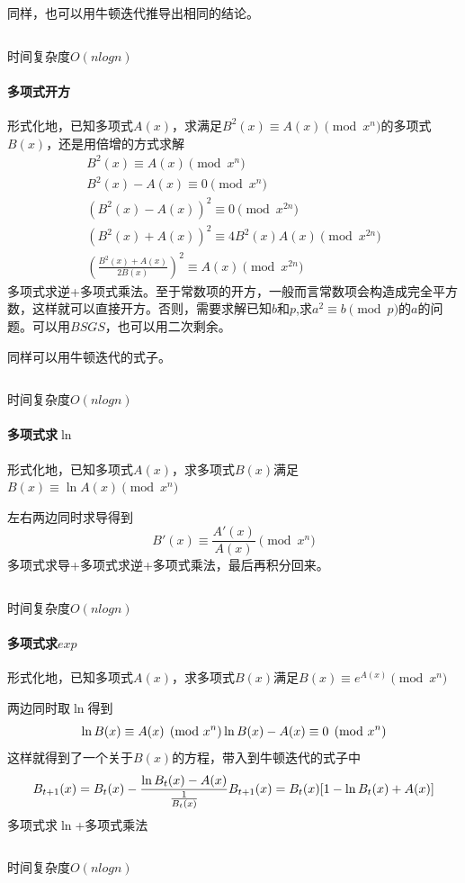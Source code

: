 \documentclass[UTF-8]{ctexart}
\newcommand{\cpp}[1]{\inputminted[bgcolor=bg,breaklines,breakanywhere=true]{c++}{#1}}
\begin{document}
			同样，也可以用牛顿迭代推导出相同的结论。
			\cpp{code//Math//polyinv.cpp}
			时间复杂度$O(nlogn)$
			\paragraph{多项式开方} 形式化地，已知多项式$A(x)$，求满足$B^2(x) \equiv A(x) \pmod{x^n}$的多项式$B(x)$，还是用倍增的方式求解
			\begin{align}
			B^2(x) \equiv A(x) \pmod{x^n} \nonumber\\ B^2(x)-A(x) \equiv 0 \pmod {x^n} \nonumber\\ (B^2(x)-A(x))^2 \equiv 0 \pmod{x^{2n}} \nonumber\\ (B^2(x)+A(x))^2 \equiv 4B^2(x)A(x) \pmod{x^{2n}} \nonumber\\ ( \frac{B^2(x)+A(x)}{2B(x)} ) ^2 \equiv A(x) \pmod{x^{2n}}\nonumber
			\end{align}
			多项式求逆+多项式乘法。至于常数项的开方，一般而言常数项会构造成完全平方数，这样就可以直接开方。否则，需要求解已知$b$和$p$,求$a^2 \equiv b \pmod{p}$的$a$的问题。可以用$BSGS$，也可以用二次剩余。
			
			同样可以用牛顿迭代的式子。
			\cpp{code//Math//polysqrt.cpp}
			时间复杂度$O(nlogn)$
			\paragraph{多项式求$\ln$} 形式化地，已知多项式$A(x)$，求多项式$B(x)$满足$B(x) \equiv \ln{A(x)} \pmod{x^n}$  
			
			左右两边同时求导得到
			$$B'(x) \equiv \frac{A'(x)}{A(x)} \pmod{x^n}$$
			多项式求导+多项式求逆+多项式乘法，最后再积分回来。
			\cpp{code//Math//polyln.cpp}
			时间复杂度$O(nlogn)$
			\paragraph{多项式求$exp$}形式化地，已知多项式$A(x)$，求多项式$B(x)$满足$B(x) \equiv e^{A(x)} \pmod{x^n}$  
			
			两边同时取$\ln$得到
			$$\ln{B(x)} \equiv A(x) \pmod{x^n} \\\\ \ln{B(x)}-A(x) \equiv 0 \pmod{x^n}$$
			这样就得到了一个关于$B(x)$的方程，带入到牛顿迭代的式子中
			$$B _ {t+1}(x)=B _ t(x)-\frac{\ln{B _ t(x)}-A(x)}{\frac{1}{B _ t(x)}} \\\\ B _ {t+1}(x)=B _ t(x)[1-\ln{B _ t(x)}+A(x)]$$
			多项式求$\ln$+多项式乘法
			\cpp{code//Math//polyexp.cpp}
			时间复杂度$O(nlogn)$
\end{document}

